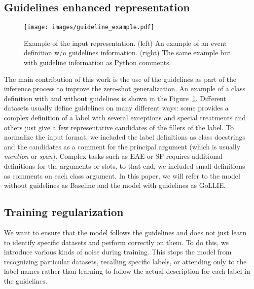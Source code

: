 \documentclass{article} \usepackage{iclr2024_conference,times}
\newcommand{\GoLLIET}{\scalerel*{\texttt{[image: logo/GoLLIE.pdf]}}{\textrm{\textbigcircle}} GoLLIE}
\begin{document}
\subsection{Guidelines enhanced representation}

\begin{figure}
    \centering
    \texttt{[image: images/guideline\_example.pdf]}
    \caption{Example of the input representation. (left) An example of an event definition w/o guidelines information. (right) The same example but with guideline information as Python comments.}
    \label{fig:guidelines-example}
\end{figure}

The main contribution of this work is the use of the guidelines as part of the inference process to improve the zero-shot generalization. An example of a class definition with and without guidelines is shown in the Figure~\ref{fig:guidelines-example}. Different datasets usually define guidelines on many different ways: some provides a complex definition of a label with several exceptions and special treatments and others just give a few representative candidates of the fillers of the label. To normalize the input format, we included the label definitions as class docstrings and the candidates as a comment for the principal argument (which is usually \textit{mention} or \textit{span}). Complex tasks such as EAE or SF requires additional definitions for the arguments or slots, to that end,  we included small definitions as comments on each class argument. In this paper, we will refer to the model without guidelines as Baseline and the model with guidelines as \GoLLIET.

\subsection{Training regularization}
\label{sec:components}

We want to ensure that the model follows the guidelines and does not just learn to identify specific datasets and perform correctly on them. To do this, we introduce various kinds of noise during training. This stops the model from recognizing particular datasets, recalling specific labels, or attending only to the label names rather than learning to follow the actual description for each label in the guidelines.
\end{document}
